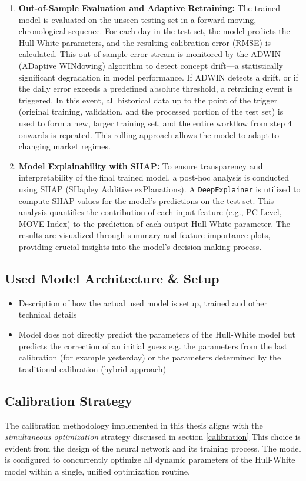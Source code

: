 {\begin{enumerate}
	\item \textbf{Out-of-Sample Evaluation and Adaptive Retraining:}
	      The trained model is evaluated on the unseen testing set in a forward-moving, chronological sequence. For each day in the test set, the model predicts the Hull-White parameters, and the resulting calibration error (RMSE) is calculated. This out-of-sample error stream is monitored by the ADWIN (ADaptive WINdowing) algorithm to detect concept drift—a statistically significant degradation in model performance. If ADWIN detects a drift, or if the daily error exceeds a predefined absolute threshold, a retraining event is triggered. In this event, all historical data up to the point of the trigger (original training, validation, and the processed portion of the test set) is used to form a new, larger training set, and the entire workflow from step 4 onwards is repeated. This rolling approach allows the model to adapt to changing market regimes.

	\item \textbf{Model Explainability with SHAP:}
	      To ensure transparency and interpretability of the final trained model, a post-hoc analysis is conducted using SHAP (SHapley Additive exPlanations). A \texttt{DeepExplainer} is utilized to compute SHAP values for the model's predictions on the test set. This analysis quantifies the contribution of each input feature (e.g., PC Level, MOVE Index) to the prediction of each output Hull-White parameter. The results are visualized through summary and feature importance plots, providing crucial insights into the model's decision-making process.
\end{enumerate}

\subsection{Used Model Architecture \& Setup}
\begin{itemize}
	\item Description of how the actual used model is setup, trained and other technical details
	\item Model does not directly predict the parameters of the Hull-White model but predicts the correction of an initial guess e.g. the parameters from the last calibration (for example yesterday) or the parameters determined by the traditional calibration (hybrid approach)
\end{itemize}

\subsection{Calibration Strategy}
The calibration methodology implemented in this thesis aligns with the \textit{simultaneous optimization} strategy discussed in section \ref{calibration} This choice is evident from the design of the neural network and its training process. The model is configured to concurrently optimize all dynamic parameters of the Hull-White model within a single, unified optimization routine.

}
